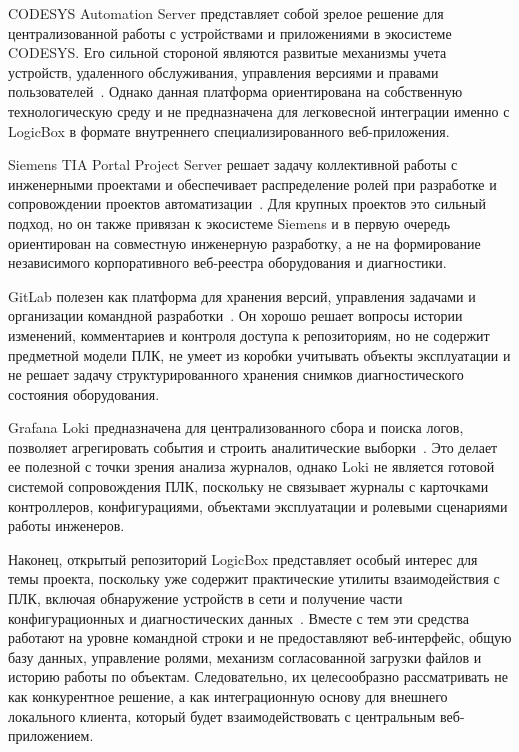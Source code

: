 CODESYS Automation Server представляет собой зрелое решение для централизованной
работы с устройствами и приложениями в экосистеме CODESYS. Его сильной стороной
являются развитые механизмы учета устройств, удаленного обслуживания,
управления версиями и правами пользователей~\cite{codesys_as}. Однако данная
платформа ориентирована на собственную технологическую среду и не предназначена
для легковесной интеграции именно с LogicBox в формате внутреннего
специализированного веб-приложения.

Siemens TIA Portal Project Server решает задачу коллективной работы с
инженерными проектами и обеспечивает распределение ролей при разработке и
сопровождении проектов автоматизации~\cite{siemens_multiuser}. Для крупных
проектов это сильный подход, но он также привязан к экосистеме Siemens и в
первую очередь ориентирован на совместную инженерную разработку, а не на
формирование независимого корпоративного веб-реестра оборудования и диагностики.

GitLab полезен как платформа для хранения версий, управления задачами и
организации командной разработки~\cite{gitlab_platform,gitlab_issues}. Он
хорошо решает вопросы истории изменений, комментариев и контроля доступа к
репозиториям, но не содержит предметной модели ПЛК, не умеет из коробки
учитывать объекты эксплуатации и не решает задачу структурированного хранения
снимков диагностического состояния оборудования.

Grafana Loki предназначена для централизованного сбора и поиска логов,
позволяет агрегировать события и строить аналитические выборки~\cite{loki_overview}.
Это делает ее полезной с точки зрения анализа журналов, однако Loki не является
готовой системой сопровождения ПЛК, поскольку не связывает журналы с карточками
контроллеров, конфигурациями, объектами эксплуатации и ролевыми сценариями
работы инженеров.

Наконец, открытый репозиторий LogicBox представляет особый интерес для темы
проекта, поскольку уже содержит практические утилиты взаимодействия с ПЛК,
включая обнаружение устройств в сети и получение части конфигурационных и
диагностических данных~\cite{logicbox_repo}. Вместе с тем эти средства работают
на уровне командной строки и не предоставляют веб-интерфейс, общую базу данных,
управление ролями, механизм согласованной загрузки файлов и историю работы по
объектам. Следовательно, их целесообразно рассматривать не как конкурентное
решение, а как интеграционную основу для внешнего локального клиента, который
будет взаимодействовать с центральным веб-приложением.

